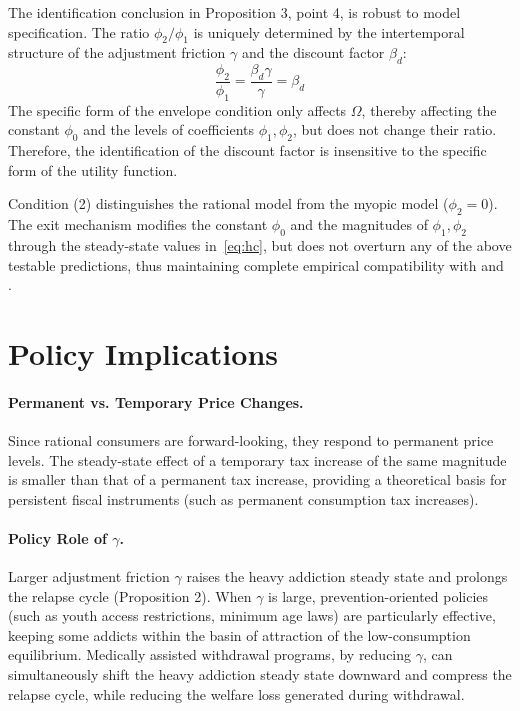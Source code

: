 \documentclass[12pt]{article}
\begin{document}
The identification conclusion in Proposition 3, point 4, is robust to model specification. The ratio $\phi_2/\phi_1$ is uniquely determined by the intertemporal structure of the adjustment friction
$\gamma$ and the discount factor $\beta_d$:
\begin{equation}\label{eq:ratio}
\frac{\phi_2}{\phi_1} = \frac{\beta_d\gamma}{\gamma} = \beta_d
\end{equation}
The specific form of the envelope condition only affects $\Omega$, thereby affecting the constant $\phi_0$ and the levels of coefficients $\phi_1, \phi_2$,
but does not change their ratio. Therefore, the identification of the discount factor is insensitive to the specific form of the utility function.

Condition (2) distinguishes the rational model from the myopic model ($\phi_2 = 0$). The exit mechanism modifies
the constant $\phi_0$ and the magnitudes of $\phi_1, \phi_2$ through the steady-state values in~\eqref{eq:hc}, but does not overturn any of the above testable predictions, thus maintaining complete empirical compatibility with
\cite{Chaloupka1991} and \cite{Becker1994}.

\section{Policy Implications}

\paragraph{Permanent vs. Temporary Price Changes.} Since rational consumers are forward-looking, they respond to permanent price
levels. The steady-state effect of a temporary tax increase of the same magnitude is smaller than that of a permanent tax increase, providing a theoretical basis for persistent
fiscal instruments (such as permanent consumption tax increases).

\paragraph{Policy Role of $\gamma$.} Larger adjustment friction $\gamma$ raises the heavy addiction steady state and prolongs the relapse
cycle (Proposition 2). When $\gamma$ is large, prevention-oriented policies (such as youth access restrictions, minimum age laws)
are particularly effective, keeping some addicts within the basin of attraction of the low-consumption equilibrium. Medically assisted withdrawal programs, by reducing $\gamma$,
can simultaneously shift the heavy addiction steady state downward and compress the relapse cycle, while reducing the welfare loss generated during withdrawal.
\end{document}
